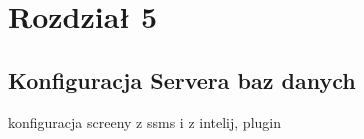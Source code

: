 \chapter{Rozdział 5}
\section{Konfiguracja Servera baz danych}

konfiguracja screeny z ssms i z intelij, plugin
